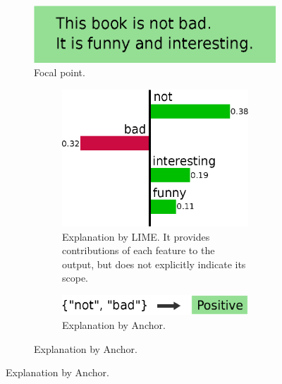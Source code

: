 \documentclass[runningheads]{llncs}
\begin{document}
\begin{figure}[tbp]
  \def\scale{0.38}
  \centering
  \begin{subfigure}[t]{0.55\textwidth}
    \centering
    \includegraphics[scale=\scale]{example-instance}
    \caption{Focal point.}\label{fig:example-instance}
    \vspace{0.5cm}
  \end{subfigure}
  \begin{subfigure}[t]{0.45\textwidth}
    \begin{subfigure}[t]{\textwidth}
      \centering
      \includegraphics[scale=\scale]{example-lime}
      \caption{%
        Explanation by LIME\@.
        It provides contributions of each feature to the output,
        but does not explicitly indicate its scope.
      }\label{fig:example-lime}
      \vspace{0.4cm}
    \end{subfigure}
    \begin{subfigure}[t]{\textwidth}
      \centering
      \includegraphics[scale=\scale]{example-anchor}
      \caption{%
        Explanation by Anchor.
}
\end{subfigure}
\end{subfigure}
\end{figure}
\end{document}
